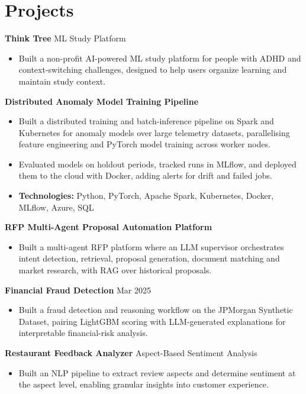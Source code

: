 \documentclass[10pt,a4paper]{article}
\begin{document}
\section{Projects}
\textbf{Think Tree} \textbar{} ML Study Platform\par
\begin{itemize}
  \item Built a non-profit AI-powered ML study platform for people with ADHD and context-switching challenges, designed to help users organize learning and maintain study context.
\end{itemize}
\textbf{Distributed Anomaly Model Training Pipeline}\par
\begin{itemize}
  \item Built a distributed training and batch-inference pipeline on Spark and Kubernetes for anomaly models over large telemetry datasets, parallelising feature engineering and PyTorch model training across worker nodes.
  \item Evaluated models on holdout periods, tracked runs in MLflow, and deployed them to the cloud with Docker, adding alerts for drift and failed jobs.
  \item \textbf{Technologies:} Python, PyTorch, Apache Spark, Kubernetes, Docker, MLflow, Azure, SQL
\end{itemize}
\textbf{RFP Multi-Agent Proposal Automation Platform}\par
\begin{itemize}
  \item Built a multi-agent RFP platform where an LLM supervisor orchestrates intent detection, retrieval, proposal generation, document matching and market research, with RAG over historical proposals.
\end{itemize}
\textbf{Financial Fraud Detection} \textbar{} Mar 2025\par
\begin{itemize}
  \item Built a fraud detection and reasoning workflow on the JPMorgan Synthetic Dataset, pairing LightGBM scoring with LLM-generated explanations for interpretable financial-risk analysis.
\end{itemize}
\textbf{Restaurant Feedback Analyzer} \textbar{} Aspect-Based Sentiment Analysis\par
\begin{itemize}
  \item Built an NLP pipeline to extract review aspects and determine sentiment at the aspect level, enabling granular insights into customer experience.
\end{itemize}
\end{document}
